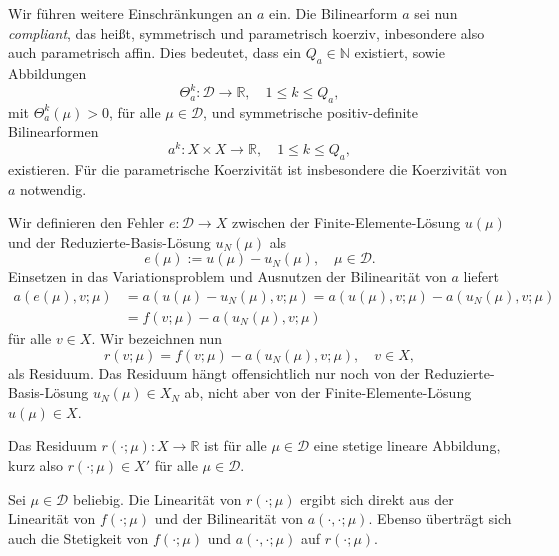 Wir führen weitere Einschränkungen an $a$ ein.
Die Bilinearform $a$ sei nun \emph{compliant}, das heißt, symmetrisch und parametrisch koerziv, inbesondere also auch parametrisch affin.
Dies bedeutet, dass ein $Q_a \in \mathbb{N}$ existiert, sowie Abbildungen
\begin{equation}
    \Theta_a^k \colon \mathcal D \to \mathbb{R}, \quad 1 \leq k \leq Q_a,
\end{equation}
mit $\Theta_a^k(\mu) > 0$, für alle $\mu \in \mathcal D$, und symmetrische positiv-definite Bilinearformen
\begin{equation}
    a^k \colon X \times X \to \mathbb{R}, \quad 1 \leq k \leq Q_a,
\end{equation}
existieren.
Für die parametrische Koerzivität ist insbesondere die Koerzivität von $a$ notwendig.

Wir definieren den Fehler $e \colon \mathcal D \to X$ zwischen der Finite-Elemente-Lösung $u(\mu)$ und der Reduzierte-Basis-Lösung $u_N(\mu)$ als
\begin{equation}
    \label{eq:fehler_fe_und_rb_lsg}
    e(\mu) := u(\mu) - u_N(\mu), \quad \mu \in \mathcal D.
\end{equation}
Einsetzen in das Variationsproblem und Ausnutzen der Bilinearität von $a$ liefert
\begin{align}
    a(e(\mu), v; \mu)
    &= a(u(\mu) - u_N(\mu), v; \mu)
    = a(u(\mu), v; \mu) - a(u_N(\mu), v; \mu) \\
    &= f(v; \mu) - a(u_N(\mu), v; \mu)
\end{align}
für alle $v \in X$.
Wir bezeichnen nun
\begin{equation}
    \label{eq:def_residuum}
    r(v; \mu) = f(v; \mu) - a(u_N(\mu), v; \mu), \quad v \in X,
\end{equation}
als Residuum.
Das Residuum hängt offensichtlich nur noch von der Reduzierte-Basis-Lösung $u_N(\mu) \in X_N$ ab, nicht aber von der Finite-Elemente-Lösung $u(\mu) \in X$.

\begin{Lemma}
    Das Residuum $r(\cdot; \mu) \colon X \to \mathbb{R}$ ist für alle $\mu \in \mathcal D$ eine stetige lineare Abbildung, kurz also $r(\cdot; \mu) \in X'$ für alle $\mu \in \mathcal D$.

    \begin{Beweis}
    Sei $\mu \in \mathcal D$ beliebig.
    Die Linearität von $r(\cdot; \mu)$ ergibt sich direkt aus der Linearität von $f(\cdot; \mu)$ und der Bilinearität von $a(\cdot, \cdot; \mu)$.
    Ebenso überträgt sich auch die Stetigkeit von $f(\cdot; \mu)$ und $a(\cdot, \cdot; \mu)$ auf $r(\cdot; \mu)$.
    \end{Beweis}
\end{Lemma}

